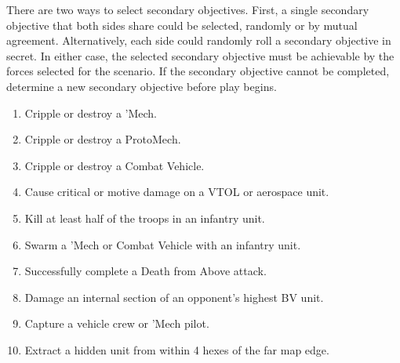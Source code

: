 There are two ways to select secondary objectives.
First, a single secondary objective that both sides share could be selected, randomly or by mutual agreement.
Alternatively, each side could randomly roll a secondary objective in secret.
In either case, the selected secondary objective must be achievable by the forces selected for the scenario.
If the secondary objective cannot be completed, determine a new secondary objective before play begins.

\begin{enumerate}

\item Cripple or destroy a 'Mech.

\item Cripple or destroy a ProtoMech.

\item Cripple or destroy a Combat Vehicle.

\item Cause critical or motive damage on a VTOL or aerospace unit.

\item Kill at least half of the troops in an infantry unit.

\item Swarm a 'Mech or Combat Vehicle with an infantry unit.

\item Successfully complete a Death from Above attack.

\item Damage an internal section of an opponent's highest BV unit.

\item Capture a vehicle crew or 'Mech pilot.

\item Extract a hidden unit from within 4 hexes of the far map edge.

\end{enumerate}
